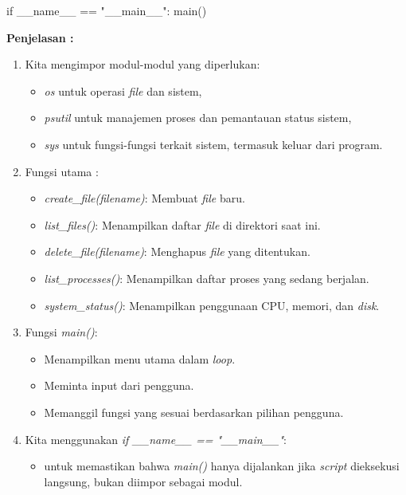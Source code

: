\documentclass[12pt]{article}
\begin{document}
\begin{enumerate}
\begin{python}
if __name__ == "__main__":
    main()
    \end{python}
    \textbf{Penjelasan :}
    \begin{enumerate}
        \item Kita mengimpor modul-modul yang diperlukan:
            \begin{itemize}
                \item \textit{os} untuk operasi \textit{file} dan sistem,
                \item \textit{psutil} untuk manajemen proses dan pemantauan status sistem,
                \item \textit{sys} untuk fungsi-fungsi terkait sistem, termasuk keluar dari program.
            \end{itemize}
        \item Fungsi utama :
            \begin{itemize}
                \item \textit{create\_file(filename)}: Membuat \textit{file} baru.
                \item \textit{list\_files()}: Menampilkan daftar \textit{file} di direktori saat ini.
                \item \textit{delete\_file(filename)}: Menghapus \textit{file} yang ditentukan.
                \item \textit{list\_processes()}: Menampilkan daftar proses yang sedang berjalan.
                \item \textit{system\_status()}: Menampilkan penggunaan CPU, memori, dan \textit{disk}.
            \end{itemize}
        \item Fungsi \textit{main()}:
            \begin{itemize}
                \item Menampilkan menu utama dalam \textit{loop}.
                \item Meminta input dari pengguna.
                \item Memanggil fungsi yang sesuai berdasarkan pilihan pengguna.
            \end{itemize}
        \item Kita menggunakan \textit{if \_\_name\_\_ == "\_\_main\_\_"}: 
            \begin{itemize}
                \item untuk memastikan bahwa \textit{main()} hanya dijalankan jika \textit{script} dieksekusi langsung, bukan diimpor sebagai modul.
            \end{itemize}
    \end{enumerate}
\end{enumerate}
\end{document}
